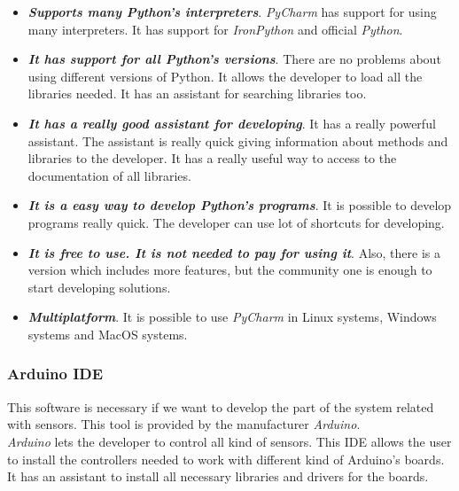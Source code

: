 \begin{itemize}

\item \textbf{\textit{Supports many Python's interpreters}}. \textit{PyCharm} has support for using many interpreters. It has support for \textit{IronPython} and official \textit{Python}.

\item \textbf{\textit{It has support for all Python's versions}}. There are no problems about using different versions of Python. It allows the developer to load all the libraries needed. It has an assistant for searching libraries too.

\item \textbf{\textit{It has a really good assistant for developing}}. It has a really powerful assistant. The assistant is really quick giving information about methods and libraries to the developer. It has a really useful way to access to the documentation of all libraries.

\item \textbf{\textit{It is a easy way to develop Python's programs}}. It is possible to develop programs really quick. The developer can use lot of shortcuts for developing.

\item \textbf{\textit{It is free to use. It is not needed to pay for using it}}. Also, there is a version which includes more features, but the community one is enough to start developing solutions.

\item \textbf{\textit{Multiplatform}}. It is possible to use \textit{PyCharm} in Linux systems, Windows systems and MacOS systems.

\end{itemize}

\subsubsection{Arduino IDE}

This software is necessary if we want to develop the part of the system related with sensors. This tool is provided by the manufacturer \textit{Arduino}.\\

\textit{Arduino} lets the developer to control all kind of sensors. This IDE allows the user to install the controllers needed to work with different kind of Arduino's boards. It has an assistant to install all necessary libraries and drivers for the boards.\\

